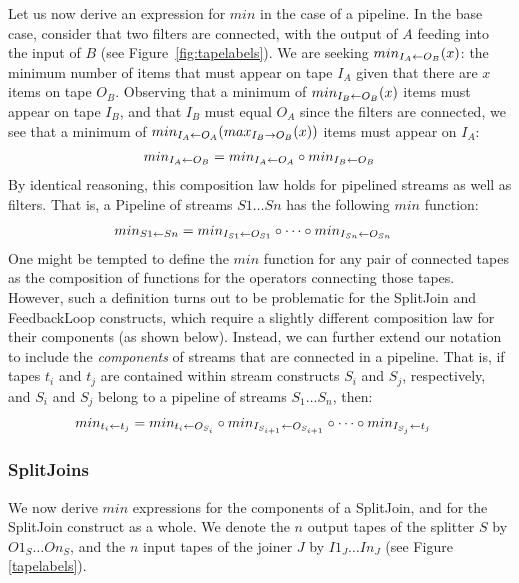 Let us now derive an expression for $min$ in the case of a pipeline.
In the base case, consider that two filters are connected, with the
output of $A$ feeding into the input of $B$ (see
Figure~\ref{fig:tapelabels}).  We are seeking $min_{I_A \leftarrow O_B}(x)$: the
minimum number of items that must appear on tape $I_A$ given that
there are $x$ items on tape $O_B$.  Observing that a minimum of
$min_{I_B \leftarrow O_B}(x)$ items must appear on tape $I_B$, and that $I_B$
must equal $O_A$ since the filters are connected, we see that a
minimum of $min_{I_A \leftarrow O_A}(max_{I_B \rightarrow O_B}(x))$ items must appear on
$I_A$:
\begin{align*}
min_{I_A \leftarrow O_B} = min_{I_A \leftarrow O_A} \circ min_{I_B \leftarrow O_B}
\end{align*}
By identical reasoning, this composition law holds for pipelined
streams as well as filters.  That is, a Pipeline of streams $S1 \dots
Sn$ has the following $min$ function:
\begin{align}
\label{eq:composepipe}
min_{S1 \leftarrow Sn} &= min_{I_{S1} \leftarrow O_{S1}} \circ \dots \circ min_{I_{Sn} \leftarrow O_{Sn}}
\end{align}
One might be tempted to define the $min$ function for any pair of
connected tapes as the composition of functions for the operators
connecting those tapes.  However, such a definition turns out to be
problematic for the SplitJoin and FeedbackLoop constructs, which
require a slightly different composition law for their components (as
shown below).  Instead, we can further extend our notation to include
the {\it components} of streams that are connected in a pipeline.
That is, if tapes $t_i$ and $t_j$ are contained within stream
constructs $S_i$ and $S_j$, respectively, and $S_i$ and $S_j$ belong
to a pipeline of streams $S_1 \dots S_n$, then:
\begin{align}
\label{eq:composetape}
min_{t_i \leftarrow t_j} &= min_{t_i \leftarrow O_{S_i}} \circ min_{I_{S_{i+1}} \leftarrow O_{S_{i+1}}}
\circ \dots \circ min_{I_{S_j} \leftarrow t_j}
\end{align}

\subsubsection{SplitJoins}
\label{sec:timesj}

We now derive $min$ expressions for the components of a SplitJoin, and
for the SplitJoin construct as a whole.  We denote the $n$ output
tapes of the splitter $S$ by $O1_S \dots On_S$, and the $n$ input
tapes of the joiner $J$ by $I1_J \dots In_J$ (see Figure
\ref{tapelabels}).


